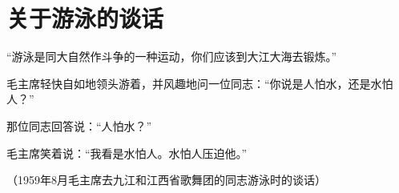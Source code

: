 \section[关于游泳的谈话（一九五九年八月）]{关于游泳的谈话}


“游泳是同大自然作斗争的一种运动，你们应该到大江大海去锻炼。”

毛主席轻快自如地领头游着，并风趣地问一位同志：“你说是人怕水，还是水怕人？”

那位同志回答说：“人怕水？”

毛主席笑着说：“我看是水怕人。水怕人压迫他。”

（1959年8月毛主席去九江和江西省歌舞团的同志游泳时的谈话）



